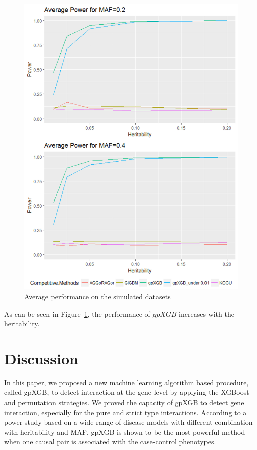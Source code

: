 \documentclass[11pt]{article}
\theoremstyle{plain}
\theoremstyle{definition}
\theoremstyle{remark}
\begin{document}
\begin{figure}[H]
    \begin{center}
       \includegraphics[scale=0.5]{Rplot01}
    \end{center}
\caption{\label{avg}Average performance on the simulated datasets}
\end{figure}

As can be seen in Figure~\ref{avg}, the performance of $gpXGB$ increases with the heritability.


\section{Discussion}

In this paper, we proposed a new machine learning algorithm based procedure, called gpXGB, to detect interaction at the gene level by applying the XGBoost and permutation strategies. We proved the capacity of gpXGB to detect gene interaction, especially for the pure and strict type interactions. According to a power study based on a wide range of disease models with different combination with heritability and MAF, gpXGB is shown to be the most powerful method when one causal pair is associated with the case-control phenotypes.\\
\end{document}
